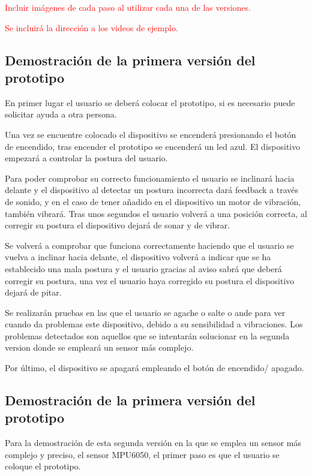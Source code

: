 \textcolor{red}{Incluir imágenes de cada paso al utilizar cada una de las versiones.}

\textcolor{red}{Se incluirá la dirección a los videos de ejemplo.}

\subsection{Demostración de la primera versión del prototipo}

En primer lugar el usuario se deberá colocar el prototipo, si es necesario puede solicitar ayuda a otra persona.

Una vez se encuentre colocado el dispositivo se encenderá presionando el botón de encendido, tras encender el prototipo se encenderá un led azul. El dispositivo empezará a controlar la postura del usuario.

Para poder comprobar su correcto funcionamiento el usuario se inclinará hacia delante y el dispositivo al detectar un postura incorrecta dará feedback a través de sonido, y en el caso de tener añadido en el dispositivo un motor de vibración, también vibrará. Tras unos segundos el usuario volverá a una posición correcta, al corregir su postura el dispositivo dejará de sonar y de vibrar.

Se volverá a comprobar que funciona correctamente haciendo que el usuario se vuelva a inclinar hacia delante, el dispositivo volverá a indicar que se ha establecido una mala postura y el usuario gracias al aviso sabrá que deberá corregir su postura, una vez el usuario haya corregido su postura el dispositivo dejará de pitar.

Se realizarán pruebas en las que el usuario se agache o salte o ande para ver cuando da problemas este dispositivo, debido a su sensibilidad a vibraciones. Los problemas detectados son aquellos que se intentarán solucionar en la segunda version donde se empleará un sensor más complejo.

Por último, el dispositivo se apagará empleando el botón de encendido/ apagado.


\subsection{Demostración de la primera versión del prototipo}

Para la demostración de esta segunda versión en la que se emplea un sensor más complejo y preciso, el sensor MPU6050, el primer paso es que el usuario se coloque el prototipo.

